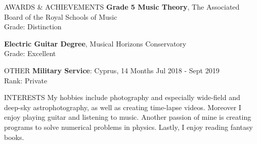 \documentclass{resume} %
\begin{document}
\begin{rSection}{AWARDS \& ACHIEVEMENTS}
{\bf Grade 5 Music Theory}, The Associated Board of the Royal Schools of Music\\
Grade: Distinction

{\bf Electric Guitar Degree}, Musical Horizons Conservatory\\
Grade: Excellent
\end{rSection} 

\bigbreak

\begin{rSection}{OTHER}
{\bf Military Service}: Cyprus, 14 Months \hfill {Jul 2018 - Sept 2019}\\
Rank: Private
\end{rSection}

\bigbreak

\begin{rSection}{INTERESTS} 
My hobbies include photography and especially wide-field and deep-sky astrophotography, as well as creating time-lapse videos.
Moreover I enjoy playing guitar and listening to music.
Another passion of mine is creating programs to solve numerical problems in physics.
Lastly, I enjoy reading fantasy books.
\end{rSection}
\end{document}
